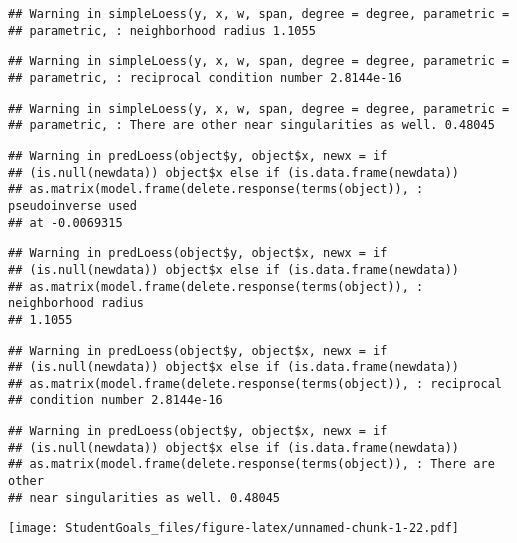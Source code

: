 \documentclass[]{article}
\newenvironment{Shaded}{\begin{snugshade}}{\end{snugshade}}
\newcommand{\CommentTok}[1]{\textcolor[rgb]{0.56,0.35,0.01}{\textit{#1}}}
\newcommand{\DataTypeTok}[1]{\textcolor[rgb]{0.13,0.29,0.53}{#1}}
\newcommand{\DecValTok}[1]{\textcolor[rgb]{0.00,0.00,0.81}{#1}}
\newcommand{\KeywordTok}[1]{\textcolor[rgb]{0.13,0.29,0.53}{\textbf{#1}}}
\newcommand{\NormalTok}[1]{#1}
\newcommand{\OperatorTok}[1]{\textcolor[rgb]{0.81,0.36,0.00}{\textbf{#1}}}
\newcommand{\StringTok}[1]{\textcolor[rgb]{0.31,0.60,0.02}{#1}}
\begin{document}
\begin{verbatim}
## Warning in simpleLoess(y, x, w, span, degree = degree, parametric =
## parametric, : neighborhood radius 1.1055
\end{verbatim}

\begin{verbatim}
## Warning in simpleLoess(y, x, w, span, degree = degree, parametric =
## parametric, : reciprocal condition number 2.8144e-16
\end{verbatim}

\begin{verbatim}
## Warning in simpleLoess(y, x, w, span, degree = degree, parametric =
## parametric, : There are other near singularities as well. 0.48045
\end{verbatim}

\begin{verbatim}
## Warning in predLoess(object$y, object$x, newx = if
## (is.null(newdata)) object$x else if (is.data.frame(newdata))
## as.matrix(model.frame(delete.response(terms(object)), : pseudoinverse used
## at -0.0069315
\end{verbatim}

\begin{verbatim}
## Warning in predLoess(object$y, object$x, newx = if
## (is.null(newdata)) object$x else if (is.data.frame(newdata))
## as.matrix(model.frame(delete.response(terms(object)), : neighborhood radius
## 1.1055
\end{verbatim}

\begin{verbatim}
## Warning in predLoess(object$y, object$x, newx = if
## (is.null(newdata)) object$x else if (is.data.frame(newdata))
## as.matrix(model.frame(delete.response(terms(object)), : reciprocal
## condition number 2.8144e-16
\end{verbatim}

\begin{verbatim}
## Warning in predLoess(object$y, object$x, newx = if
## (is.null(newdata)) object$x else if (is.data.frame(newdata))
## as.matrix(model.frame(delete.response(terms(object)), : There are other
## near singularities as well. 0.48045
\end{verbatim}

\texttt{[image: StudentGoals\_files/figure-latex/unnamed-chunk-1-22.pdf]}

\begin{Shaded}
\end{Shaded}
\end{document}

